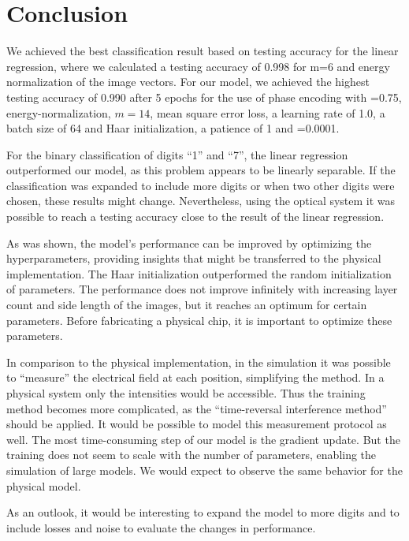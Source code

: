 \section{Conclusion} 
We achieved the best classification result based on testing accuracy for the linear regression, where we calculated a testing accuracy of 0.998 for m=6 and energy normalization of the image vectors.
For our model, we achieved the highest testing accuracy of 0.990 after 5 epochs for the use of phase encoding with =0.75, energy-normalization, $m=14$, mean square error loss, a learning rate of 1.0, a batch size of 64 and Haar initialization, a patience of 1 and =0.0001.

For the binary classification of digits ``1'' and ``7'', the linear regression outperformed our model, as this problem appears to be linearly separable.
If the classification was expanded to include more digits or when two other digits were chosen, these results might change.
Nevertheless, using the optical system it was possible to reach a testing accuracy close to the result of the linear regression.

As was shown, the model's performance can be improved by optimizing the hyperparameters, providing insights that might be transferred to the physical implementation.
The Haar initialization outperformed the random initialization of parameters.
The performance does not improve infinitely with increasing layer count and side length of the images, but it reaches an optimum for certain parameters. Before fabricating a physical chip, it is important to optimize these parameters.%

In comparison to the physical implementation, in the simulation it was possible to ``measure'' the electrical field at each position, simplifying the method. In a physical system only the intensities would be accessible. Thus the training method becomes more complicated, as the ``time-reversal interference method'' should be applied.
It would be possible to model this measurement protocol as well.
The most time-consuming step of our model is the gradient update. But the training does not seem to scale with the number of parameters, enabling the simulation of large models.
We would expect to observe the same behavior for the physical model.

As an outlook, it would be interesting to expand the model to more digits and to include losses and noise to evaluate the changes in performance.
